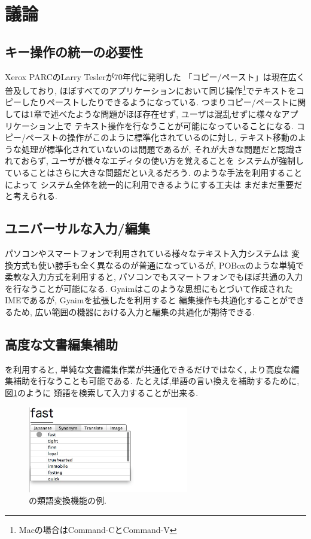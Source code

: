 \section{議論}

\subsection{キー操作の統一の必要性}

Xerox PARCのLarry Teslerが70年代に発明した\cite{Tesler:CopyPaste}
「コピー/ペースト」は現在広く普及しており,
ほぼすべてのアプリケーションにおいて同じ操作\footnote{
  Macの場合はCommand-CとCommand-V
}でテキストをコピーしたりペーストしたりできるようになっている.
つまりコピー/ペーストに関しては1章で述べたような問題がほぼ存在せず,
ユーザは混乱せずに様々なアプリケーション上で
テキスト操作を行なうことが可能になっていることになる.
コピー/ペーストの操作がこのように標準化されているのに対し,
テキスト移動のような処理が標準化されていないのは問題であるが,
それが大きな問題だと認識されておらず,
ユーザが様々なエディタの使い方を覚えることを
システムが強制していることはさらに大きな問題だといえるだろう.
{\system}のような手法を利用することによって
システム全体を統一的に利用できるようにする工夫は
まだまだ重要だと考えられる.

\subsection{ユニバーサルな入力/編集}

パソコンやスマートフォンで利用されている様々なテキスト入力システムは
変換方式も使い勝手も全く異なるのが普通になっているが,
POBox\cite{Masui:POBox}のような単純で柔軟な入力方式を利用すると,
パソコンでもスマートフォンでもほぼ共通の入力を行なうことが可能になる.
Gyaimはこのような思想にもとづいて作成されたIMEであるが,
Gyaimを拡張した{\system}を利用すると
編集操作も共通化することができるため,
広い範囲の機器における入力と編集の共通化が期待できる.

\subsection{高度な文書編集補助}

{\system}を利用すると,
単純な文書編集作業が共通化できるだけではなく,
より高度な編集補助を行なうことも可能である.
たとえば,単語の言い換えを補助するために,図\ref{synonym}のように
類語を検索して入力することが出来る.

\begin{figure}[H]
\centerline{\includegraphics[width=70mm,bb=0 0 350 250]{figures/synonym.png}}
\caption{{\system}の類語変換機能の例.}
\label{synonym}
\end{figure}

